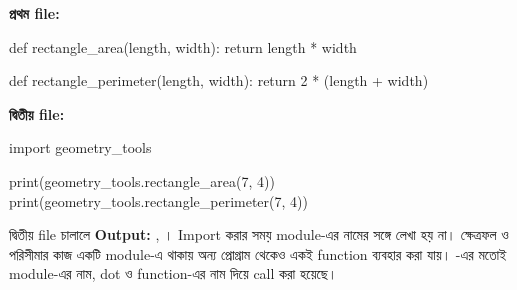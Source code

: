 \textbf{প্রথম file: }
\begin{pythoncode}
def rectangle_area(length, width):
    return length * width

def rectangle_perimeter(length, width):
    return 2 * (length + width)
\end{pythoncode}
\textbf{দ্বিতীয় file: }
\begin{pythoncode}
import geometry_tools

print(geometry_tools.rectangle_area(7, 4))
print(geometry_tools.rectangle_perimeter(7, 4))
\end{pythoncode}
দ্বিতীয় file চালালে \textbf{Output:} , । Import করার সময়
module-এর নামের সঙ্গে  লেখা হয় না। ক্ষেত্রফল ও পরিসীমার কাজ
একটি module-এ থাকায় অন্য প্রোগ্রাম থেকেও একই function ব্যবহার করা যায়।
-এর মতোই module-এর নাম, dot ও function-এর নাম
দিয়ে call করা হয়েছে।

